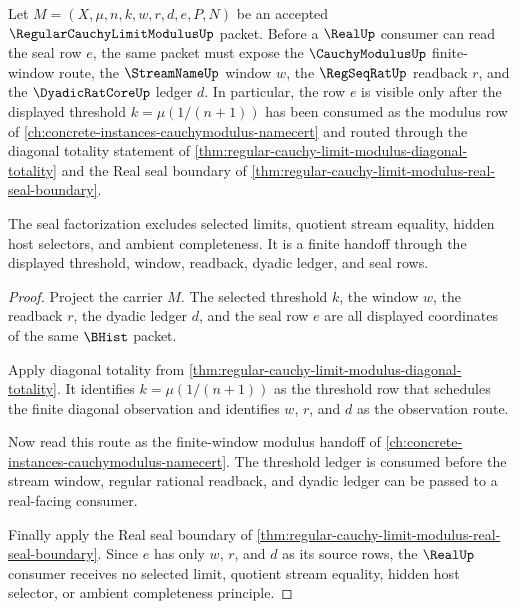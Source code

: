 \begin{theorem}
\label{thm:regular-cauchy-limit-modulus-seal}
Let $M=(X,\mu,n,k,w,r,d,e,P,N)$ be an accepted $\RegularCauchyLimitModulusUp$ packet. Before a $\RealUp$ consumer can read the seal row $e$, the same packet must expose the $\CauchyModulusUp$ finite-window route, the $\StreamNameUp$ window $w$, the $\RegSeqRatUp$ readback $r$, and the $\DyadicRatCoreUp$ ledger $d$. In particular, the row $e$ is visible only after the displayed threshold $k=\mu(1/(n+1))$ has been consumed as the modulus row of \autoref{ch:concrete-instances-cauchymodulus-namecert} and routed through the diagonal totality statement of \autoref{thm:regular-cauchy-limit-modulus-diagonal-totality} and the Real seal boundary of \autoref{thm:regular-cauchy-limit-modulus-real-seal-boundary}.

The seal factorization excludes selected limits, quotient stream equality, hidden host selectors, and ambient completeness. It is a finite handoff through the displayed threshold, window, readback, dyadic ledger, and seal rows.
\end{theorem}
\begin{proof}
Project the carrier $M$. The selected threshold $k$, the window $w$, the readback $r$, the dyadic ledger $d$, and the seal row $e$ are all displayed coordinates of the same $\BHist$ packet.

Apply diagonal totality from \autoref{thm:regular-cauchy-limit-modulus-diagonal-totality}. It identifies $k=\mu(1/(n+1))$ as the threshold row that schedules the finite diagonal observation and identifies $w$, $r$, and $d$ as the observation route.

Now read this route as the finite-window modulus handoff of \autoref{ch:concrete-instances-cauchymodulus-namecert}. The threshold ledger is consumed before the stream window, regular rational readback, and dyadic ledger can be passed to a real-facing consumer.

Finally apply the Real seal boundary of \autoref{thm:regular-cauchy-limit-modulus-real-seal-boundary}. Since $e$ has only $w$, $r$, and $d$ as its source rows, the $\RealUp$ consumer receives no selected limit, quotient stream equality, hidden host selector, or ambient completeness principle.
\end{proof}

